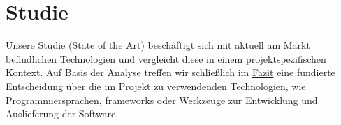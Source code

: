 \chapter{Studie}
Unsere Studie (State of the Art) beschäftigt sich mit aktuell am Markt befindlichen Technologien und vergleicht diese in einem projektspezifischen Kontext. Auf Basis der Analyse treffen wir schließlich im \hyperref[sec:fazit]{Fazit} eine fundierte Entscheidung über die im Projekt zu verwendenden Technologien, wie Programmiersprachen, \gls{framework}s oder Werkzeuge zur Entwicklung und Auslieferung der Software.